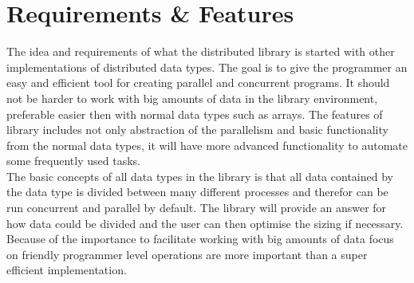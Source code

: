 

\section{Requirements \& Features}
The idea and requirements of what the distributed library is started with other implementations of distributed data types. The goal is to give the programmer an easy and efficient tool for creating parallel and concurrent programs. It should not be harder to work with big amounts of data in the library environment, preferable easier then with normal data types such as arrays. The features of library includes not only abstraction of the parallelism and basic functionality from the normal data types, it will have more advanced functionality to automate some frequently used tasks. \\

The basic concepts of all data types in the library is that all data contained by the data type is divided between many different processes and therefor can be run concurrent and parallel by default. The library will provide an answer for how data could be divided and the user can then optimise the sizing if necessary. Because of the importance to facilitate working with big amounts of data focus on friendly programmer level operations are more important than a super efficient implementation.